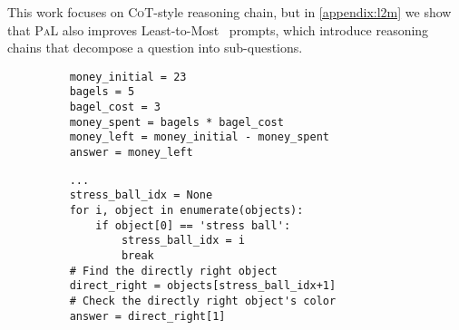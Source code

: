 \documentclass[dvipsnames]{article} \usepackage[accepted]{icml2022}
\newcommand{\ours}{\textsc{PaL}\xspace}
\newcommand{\cotp}{\textsc{CoT}\xspace}
\newcommand{\gsm}{\textsc{gsm8k}\xspace}
\begin{document}
This work focuses on \cotp-style reasoning chain, but in \autoref{appendix:l2m} we show that \ours also improves  Least-to-Most~\citep{zhou2022least} prompts,  which introduce reasoning chains that decompose a question into sub-questions. 






 


\begin{figure*}[!ht]
    \centering
    \begin{subfigure}[t]{.5\textwidth}
    \begin{verbatim}
    money_initial = 23
    bagels = 5
    bagel_cost = 3
    money_spent = bagels * bagel_cost
    money_left = money_initial - money_spent
    answer = money_left
    \end{verbatim}
    \label{fig:mathsprompt:ours}
    \end{subfigure}
    \caption{Example prompt for the mathematical reasoning tasks, from the \gsm benchmark.}
    \label{fig:mathsprompt}
 \end{figure*}

\begin{figure*}[t]
    \centering

    \begin{subfigure}[t]{.5\textwidth}
     \begin{verbatim}
    ...
    stress_ball_idx = None
    for i, object in enumerate(objects):
        if object[0] == 'stress ball':
            stress_ball_idx = i
            break
    # Find the directly right object
    direct_right = objects[stress_ball_idx+1]
    # Check the directly right object's color
    answer = direct_right[1]
    \end{verbatim}
    \end{subfigure}
    \caption{An example for a \ours prompt in the \textsc{Colored Objects} task.
    For space considerations, we omit the code that creates the list \texttt{objects}.
    }
    \label{fig:color-obj:prompt}
     \end{figure*} 
\end{document}
